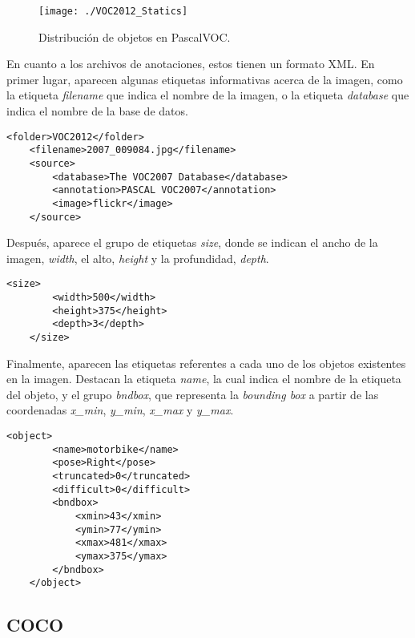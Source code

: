 \documentclass[a4paper, 12pt, oneside]{book}
\begin{document}
\begin{figure}[H]
\begin{center}
\texttt{[image: ./VOC2012\_Statics]}
\caption{Distribución de objetos en PascalVOC.}
\end{center}
\end{figure}

En cuanto a los archivos de anotaciones, estos tienen un formato XML. En primer lugar, aparecen algunas etiquetas informativas acerca de la imagen, como la etiqueta \textit{filename} que indica el nombre de la imagen, o la etiqueta \textit{database} que indica el nombre de la base de datos.\\

\begin{lstlisting}[frame=single]
	<folder>VOC2012</folder>
	<filename>2007_009084.jpg</filename>
	<source>
		<database>The VOC2007 Database</database>
		<annotation>PASCAL VOC2007</annotation>
		<image>flickr</image>
	</source>
\end{lstlisting}


Después, aparece el grupo de etiquetas \textit{size}, donde se indican el ancho de la imagen, \textit{width}, el alto, \textit{height} y la profundidad, \textit{depth}.\\

\begin{lstlisting}[frame=single]
	<size>
		<width>500</width>
		<height>375</height>
		<depth>3</depth>
	</size>
\end{lstlisting}

Finalmente, aparecen las etiquetas referentes a cada uno de los objetos existentes en la imagen. Destacan la etiqueta \textit{name}, la cual indica el nombre de la etiqueta del objeto, y el grupo \textit{bndbox}, que representa la \textit{bounding box} a partir de las coordenadas \textit{x\_{min}}, \textit{y\_{min}}, \textit{x\_{max}} y \textit{y\_{max}}.\\

\begin{lstlisting}[frame=single]
	<object>
		<name>motorbike</name>
		<pose>Right</pose>
		<truncated>0</truncated>
		<difficult>0</difficult>
		<bndbox>
			<xmin>43</xmin>
			<ymin>77</ymin>
			<xmax>481</xmax>
			<ymax>375</ymax>
		</bndbox>
	</object>
\end{lstlisting}

\subsection{COCO}\label{COCO}
\end{document}
